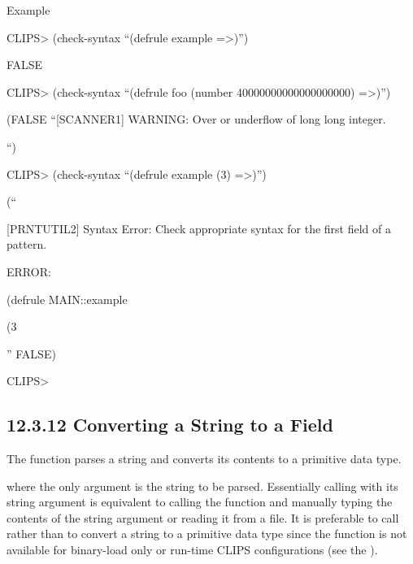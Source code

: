 \documentclass[letterpaper,10pt,english]{sphinxmanual}
\begin{document}
Example

CLIPS\textgreater{} (check-syntax “(defrule example =\textgreater{})”)

FALSE

CLIPS\textgreater{} (check-syntax “(defrule foo (number 40000000000000000000) =\textgreater{})”)

(FALSE “{[}SCANNER1{]} WARNING: Over or underflow of long long integer.

“)

CLIPS\textgreater{} (check-syntax “(defrule example (3) =\textgreater{})”)

(“

{[}PRNTUTIL2{]} Syntax Error: Check appropriate syntax for the first field
of a pattern.

ERROR:

(defrule MAIN::example

(3

” FALSE)

CLIPS\textgreater{}


\subsection{12.3.12 Converting a String to a Field}
\label{\detokenize{actions:converting-a-string-to-a-field}}
The  function parses a string and converts its
contents to a primitive data type.


\begin{sphinxVerbatim}[commandchars=\\\{\}]
 
\end{sphinxVerbatim}

where the only argument is the string to be parsed. Essentially calling
 with its string argument is equivalent to calling
the  function and manually typing the contents of the string
argument or reading it from a file. It is preferable to call
 rather than  to convert a string to a
primitive data type since the  function is not available for
binary-load only or run-time CLIPS configurations (see the ).
\end{document}
